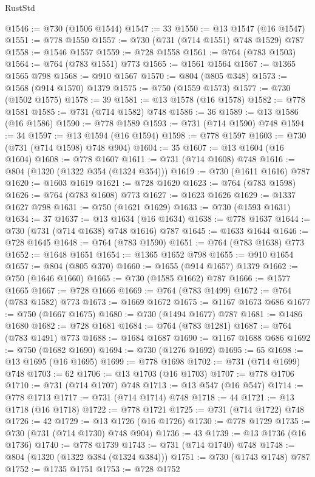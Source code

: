 \begin{lexlean}{RustStd}
\begin{coremodule}
@1546 := @730 (@1506 @1544)
@1547 := 33
@1550 := @13 @1547 (@16 @1547)
@1551 := @778 @1550
@1557 := @730 (@731 (@714 @1551) @748 @1529) @787
@1558 := @1546 @1557
@1559 := @728 @1558
@1561 := @764 (@783 @1503)
@1564 := @764 (@783 @1551) @773
@1565 := @1561 @1564
@1567 := @1365 @1565 @798
@1568 := @910 @1567
@1570 := @804 (@805 @348)
@1573 := @1568 (@914 @1570) @1379
@1575 := @750 (@1559 @1573)
@1577 := @730 (@1502 @1575)
@1578 := 39
@1581 := @13 @1578 (@16 @1578)
@1582 := @778 @1581
@1585 := @731 (@714 @1582) @748
@1586 := 36
@1589 := @13 @1586 (@16 @1586)
@1590 := @778 @1589
@1593 := @731 (@714 @1590) @748
@1594 := 34
@1597 := @13 @1594 (@16 @1594)
@1598 := @778 @1597
@1603 := @730 (@731 (@714 @1598) @748 @904)
@1604 := 35
@1607 := @13 @1604 (@16 @1604)
@1608 := @778 @1607
@1611 := @731 (@714 @1608) @748
@1616 := @804 (@1320 (@1322 @354 (@1324 @354)))
@1619 := @730 (@1611 @1616) @787
@1620 := @1603 @1619
@1621 := @728 @1620
@1623 := @764 (@783 @1598)
@1626 := @764 (@783 @1608) @773
@1627 := @1623 @1626
@1629 := @1337 @1627 @798
@1631 := @750 (@1621 @1629)
@1633 := @730 (@1593 @1631)
@1634 := 37
@1637 := @13 @1634 (@16 @1634)
@1638 := @778 @1637
@1644 := @730 (@731 (@714 @1638) @748 @1616) @787
@1645 := @1633 @1644
@1646 := @728 @1645
@1648 := @764 (@783 @1590)
@1651 := @764 (@783 @1638) @773
@1652 := @1648 @1651
@1654 := @1365 @1652 @798
@1655 := @910 @1654
@1657 := @804 (@805 @370)
@1660 := @1655 (@914 @1657) @1379
@1662 := @750 (@1646 @1660)
@1665 := @730 (@1585 @1662) @787
@1666 := @1577 @1665
@1667 := @728 @1666
@1669 := @764 (@783 @1499)
@1672 := @764 (@783 @1582) @773
@1673 := @1669 @1672
@1675 := @1167 @1673 @686
@1677 := @750 (@1667 @1675)
@1680 := @730 (@1494 @1677) @787
@1681 := @1486 @1680
@1682 := @728 @1681
@1684 := @764 (@783 @1281)
@1687 := @764 (@783 @1491) @773
@1688 := @1684 @1687
@1690 := @1167 @1688 @686
@1692 := @750 (@1682 @1690)
@1694 := @730 (@1276 @1692)
@1695 := 65
@1698 := @13 @1695 (@16 @1695)
@1699 := @778 @1698
@1702 := @731 (@714 @1699) @748
@1703 := 62
@1706 := @13 @1703 (@16 @1703)
@1707 := @778 @1706
@1710 := @731 (@714 @1707) @748
@1713 := @13 @547 (@16 @547)
@1714 := @778 @1713
@1717 := @731 (@714 @1714) @748
@1718 := 44
@1721 := @13 @1718 (@16 @1718)
@1722 := @778 @1721
@1725 := @731 (@714 @1722) @748
@1726 := 42
@1729 := @13 @1726 (@16 @1726)
@1730 := @778 @1729
@1735 := @730 (@731 (@714 @1730) @748 @904)
@1736 := 43
@1739 := @13 @1736 (@16 @1736)
@1740 := @778 @1739
@1743 := @731 (@714 @1740) @748
@1748 := @804 (@1320 (@1322 @384 (@1324 @384)))
@1751 := @730 (@1743 @1748) @787
@1752 := @1735 @1751
@1753 := @728 @1752

\end{coremodule}
\end{lexlean}
